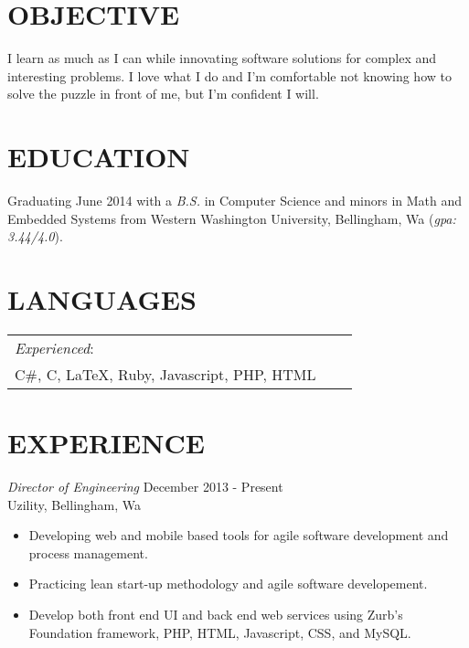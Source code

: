 \documentclass[line,margin]{res}
\begin{document}
\address{23714 NE 61st Street, Redmond, Wa, 98053}
\address{(425) 241-7977 \hspace{13mm} kyle.rader@ieee.org}
 
\begin{resume}
 
\section{OBJECTIVE}       I learn as much as I can while innovating software solutions for complex and interesting problems. I love what I do and I'm comfortable not knowing how to solve the puzzle in front of me, but I'm confident I will.
 
 
\section{EDUCATION}   Graduating June 2014 with a {\sl B.S.} in Computer Science and minors in Math and Embedded Systems from 
			      Western Washington University, Bellingham, Wa ({\sl gpa: 3.44/4.0}).
 
 
\section{LANGUAGES}
	\begin{table}[h]
		\begin{tabular}{ l l l }
			{\sl Experienced}: \\
			C\#, C, {\LaTeX}, Ruby, Javascript, PHP, HTML
					
		\end{tabular}
 	\end{table}

\section{EXPERIENCE}

		{\sl Director of Engineering} \hfill December 2013 - Present \\
                	Uzility, Bellingham, Wa
               	 \begin{itemize}  \itemsep -2pt
                		\item Developing web and mobile based tools for agile software development and process management.  
                		\item Practicing lean start-up methodology and agile software developement. 
                		\item Develop both front end UI and back end web services using Zurb's Foundation framework, PHP, HTML, Javascript, CSS, and MySQL.  
                	\end{itemize}


\end{resume}
\end{document}
